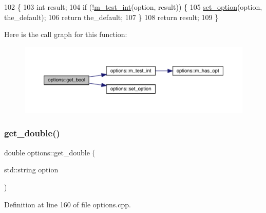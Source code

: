 \begin{DoxyCode}
102 \{
103   \textcolor{keywordtype}{int} result;
104   \textcolor{keywordflow}{if} (!\hyperlink{classoptions_ad9b4461e633b73acc2fde7752ef60d41}{m\_test\_int}(option, result)) \{
105     \hyperlink{classoptions_a3c23831e4218f9a88cddc81337518046}{set\_option}(option, the\_default);
106     \textcolor{keywordflow}{return} the\_default;
107   \}
108   \textcolor{keywordflow}{return} result;
109 \}
\end{DoxyCode}
Here is the call graph for this function\+:\nopagebreak
\begin{figure}[H]
\begin{center}
\leavevmode
\includegraphics[width=350pt]{classoptions_a9ce5a1af62eeb42a88a1b47f5891e247_cgraph}
\end{center}
\end{figure}
\mbox{\label{classoptions_a0e8ff0d44b9192754451f9dcd47cd559}} 
\subsubsection{\texorpdfstring{get\+\_\+double()}{get\_double()}\hspace{0.1cm}{\footnotesize\ttfamily [1/2]}}
{\footnotesize\ttfamily double options\+::get\+\_\+double (\begin{DoxyParamCaption}\item[{std\+::string}]{option }\end{DoxyParamCaption})}



Definition at line 160 of file options.\+cpp.


